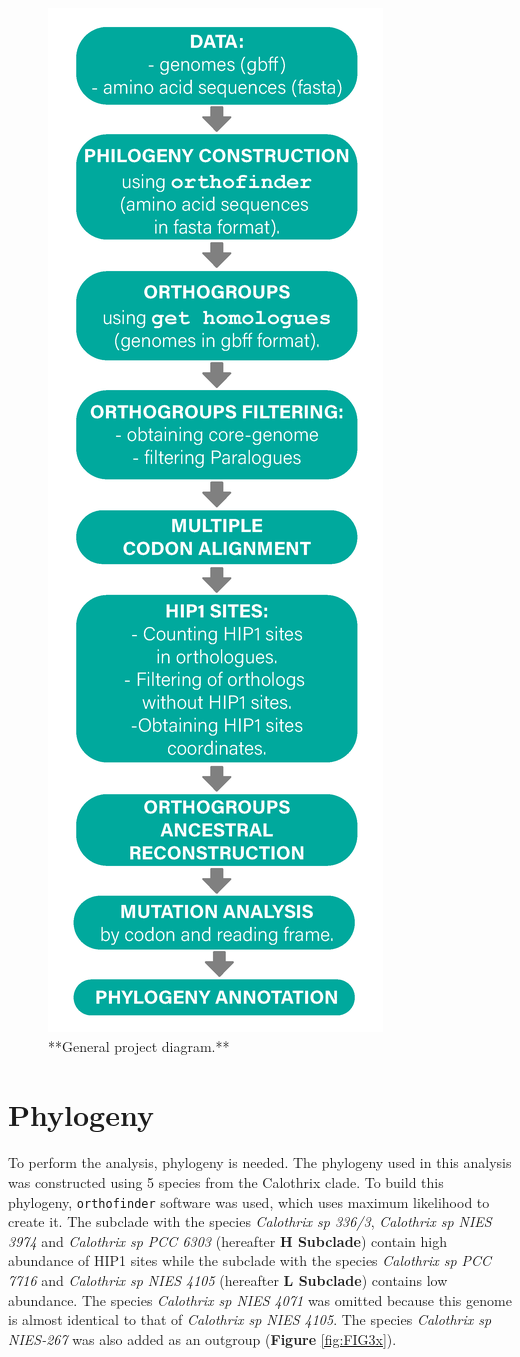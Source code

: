 \documentclass[
]{book}
\begin{document}
\begin{figure}

{\centering \includegraphics[width=0.3\linewidth]{figures/4x/pipeline} 

}

\caption{**General project diagram.**}\label{fig:FIG2x}
\end{figure}

\hypertarget{phylogeny}{%
\section{Phylogeny}\label{phylogeny}}

To perform the analysis, phylogeny is needed. The phylogeny used in this analysis was constructed using 5 species from the Calothrix clade. To build this phylogeny, \texttt{orthofinder} software was used, which uses maximum likelihood to create it. The subclade with the species \emph{Calothrix sp 336/3}, \emph{Calothrix sp NIES 3974} and \emph{Calothrix sp PCC 6303} (hereafter \textbf{H Subclade}) contain high abundance of HIP1 sites while the subclade with the species \emph{Calothrix sp PCC 7716} and \emph{Calothrix sp NIES 4105} (hereafter \textbf{L Subclade}) contains low abundance. The species \emph{Calothrix sp NIES 4071} was omitted because this genome is almost identical to that of \emph{Calothrix sp NIES 4105}. The species \emph{Calothrix sp NIES-267} was also added as an outgroup (\textbf{Figure} \ref{fig:FIG3x}).
\end{document}
